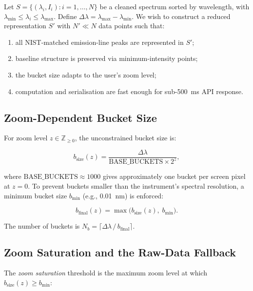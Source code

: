 \documentclass[a4paper,twocolumn,10pt]{article}
\begin{document}
Let $S = \{(\lambda_i, I_i) : i = 1, \ldots, N\}$ be a cleaned
spectrum sorted by wavelength, with $\lambda_{\min} \leq \lambda_i
\leq \lambda_{\max}$.  Define $\Delta\lambda = \lambda_{\max} -
\lambda_{\min}$.  We wish to construct a reduced representation
$S'$ with $N' \ll N$ data points such that:
\begin{enumerate}[nosep,leftmargin=*]
  \item all NIST-matched emission-line peaks are represented in $S'$;
  \item baseline structure is preserved via minimum-intensity points;
  \item the bucket size adapts to the user's zoom level;
  \item computation and serialisation are fast enough for
    sub-\SI{500}{\milli\second} API response.
\end{enumerate}

\subsection{Zoom-Dependent Bucket Size}

For zoom level $z \in \mathbb{Z}_{\geq 0}$, the unconstrained
bucket size is:

\begin{equation}
\label{eq:bsize}
b_{\text{size}}(z) =
  \frac{\Delta\lambda}{\text{BASE\_BUCKETS} \times 2^z},
\end{equation}

where $\text{BASE\_BUCKETS} \approx 1000$ gives approximately one
bucket per screen pixel at $z = 0$.  To prevent buckets smaller than
the instrument's spectral resolution, a minimum bucket size
$b_{\min}$ (e.g., \SI{0.01}{\nano\metre}) is enforced:

\begin{equation}
\label{eq:bfinal}
b_{\text{final}}(z) = \max\!\bigl(b_{\text{size}}(z),\; b_{\min}\bigr).
\end{equation}

The number of buckets is
$N_b = \lceil \Delta\lambda \,/\, b_{\text{final}} \rceil$.

\subsection{Zoom Saturation and the Raw-Data Fallback}

The \emph{zoom saturation} threshold is the maximum zoom level at
which $b_{\text{size}}(z) \geq b_{\min}$:
\end{document}
